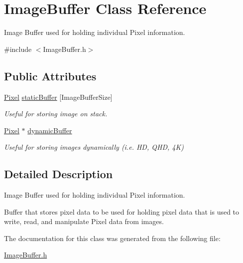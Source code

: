 \hypertarget{structImageBuffer}{}\section{Image\+Buffer Class Reference}
\label{structImageBuffer}


Image Buffer used for holding individual Pixel information.  




{\ttfamily \#include $<$Image\+Buffer.\+h$>$}

\subsection*{Public Attributes}
\begin{DoxyCompactItemize}
\item 
\mbox{\label{structImageBuffer_ac6afda7837bf4f19c2fa1950ca135f09}} 
\hyperlink{Pixel_8h_a5255638464dae60a20a4cef759bc42ce}{Pixel} \hyperlink{structImageBuffer_ac6afda7837bf4f19c2fa1950ca135f09}{static\+Buffer} \mbox{[}Image\+Buffer\+Size\mbox{]}
\begin{DoxyCompactList}\small\item\em Useful for storing image on stack. \end{DoxyCompactList}\item 
\mbox{\label{structImageBuffer_a661f5deb3b9615e5fbcd71cbe22403b3}} 
\hyperlink{Pixel_8h_a5255638464dae60a20a4cef759bc42ce}{Pixel} $\ast$ \hyperlink{structImageBuffer_a661f5deb3b9615e5fbcd71cbe22403b3}{dynamic\+Buffer}
\begin{DoxyCompactList}\small\item\em Useful for storing images dynamically (i.\+e. HD, Q\+HD, 4K) \end{DoxyCompactList}\end{DoxyCompactItemize}


\subsection{Detailed Description}
Image Buffer used for holding individual Pixel information. 

Buffer that stores pixel data to be used for holding pixel data that is used to write, read, and manipulate Pixel data from images. 

The documentation for this class was generated from the following file\+:\begin{DoxyCompactItemize}
\item 
\hyperlink{ImageBuffer_8h}{Image\+Buffer.\+h}\end{DoxyCompactItemize}

